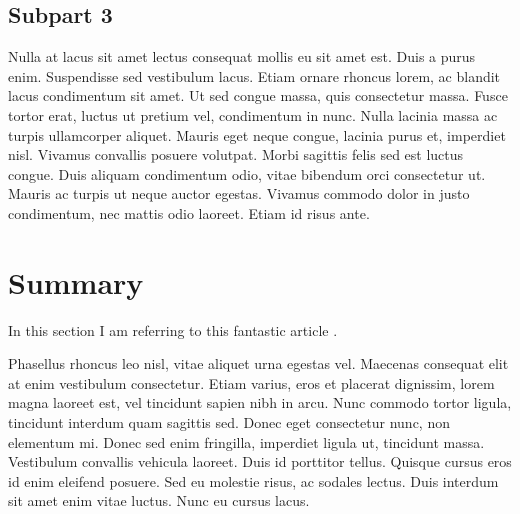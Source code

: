 \documentclass[10pt]{article}
\begin{document}
\subsection{Subpart 3}
Nulla at lacus sit amet lectus consequat mollis eu sit amet est. Duis a purus enim. Suspendisse sed vestibulum lacus. Etiam ornare rhoncus lorem, ac blandit lacus condimentum sit amet. Ut sed congue massa, quis consectetur massa. Fusce tortor erat, luctus ut pretium vel, condimentum in nunc. Nulla lacinia massa ac turpis ullamcorper aliquet. Mauris eget neque congue, lacinia purus et, imperdiet nisl. Vivamus convallis posuere volutpat. Morbi sagittis felis sed est luctus congue. Duis aliquam condimentum odio, vitae bibendum orci consectetur ut. Mauris ac turpis ut neque auctor egestas. Vivamus commodo dolor in justo condimentum, nec mattis odio laoreet. Etiam id risus ante.

\section{Summary}
In this section I am referring to this fantastic article \cite{article1}.

Phasellus rhoncus leo nisl, vitae aliquet urna egestas vel. Maecenas consequat elit at enim vestibulum consectetur. Etiam varius, eros et placerat dignissim, lorem magna laoreet est, vel tincidunt sapien nibh in arcu. Nunc commodo tortor ligula, tincidunt interdum quam sagittis sed. Donec eget consectetur nunc, non elementum mi. Donec sed enim fringilla, imperdiet ligula ut, tincidunt massa. Vestibulum convallis vehicula laoreet. Duis id porttitor tellus. Quisque cursus eros id enim eleifend posuere. Sed eu molestie risus, ac sodales lectus. Duis interdum sit amet enim vitae luctus. Nunc eu cursus lacus.

\printbibliography
\end{document}
